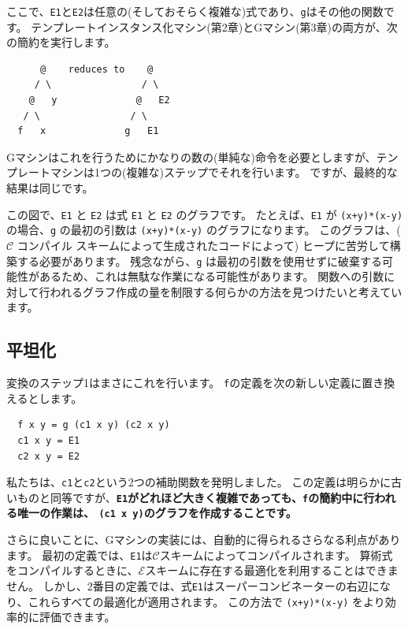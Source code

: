 \documentclass{jbook}
\begin{document}
ここで、\texttt{E1}と\texttt{E2}は任意の(そしておそらく複雑な)式であり、\texttt{g}はその他の関数です。
テンプレートインスタンス化マシン(第2章)とGマシン(第3章)の両方が、次の簡約を実行します。

\begin{verbatim}
      @    reduces to    @
     / \                / \
    @   y              @   E2
   / \                / \
  f   x              g   E1
\end{verbatim}

Gマシンはこれを行うためにかなりの数の(単純な)命令を必要としますが、テンプレートマシンは1つの(複雑な)ステップでそれを行います。
ですが、最終的な結果は同じです。

この図で、\texttt{E1} と \texttt{E2} は式 \texttt{E1} と \texttt{E2} のグラフです。
たとえば、\texttt{E1} が \texttt{(x+y)*(x-y)} の場合、\texttt{g} の最初の引数は \texttt{(x+y)*(x-y)} のグラフになります。
このグラフは、($\mathcal{C}$ コンパイル スキームによって生成されたコードによって) ヒープに苦労して構築する必要があります。
残念ながら、\texttt{g} は最初の引数を使用せずに破棄する可能性があるため、これは無駄な作業になる可能性があります。
関数への引数に対して行われるグラフ作成の量を制限する何らかの方法を見つけたいと考えています。

\subsection{平坦化}

変換のステップ1はまさにこれを行います。
\texttt{f}の定義を次の新しい定義に置き換えるとします。

\begin{verbatim}
  f x y = g (c1 x y) (c2 x y)
  c1 x y = E1
  c2 x y = E2
\end{verbatim}

私たちは、\texttt{c1}と\texttt{c2}という2つの補助関数を発明しました。
この定義は明らかに古いものと同等ですが、\textbf{\texttt{E1}がどれほど大きく複雑であっても、\texttt{f}の簡約中に行われる唯一の作業は、
	\texttt{(c1 x y)}のグラフを作成することです。}

さらに良いことに、Gマシンの実装には、自動的に得られるさらなる利点があります。
最初の定義では、\texttt{E1}は$\mathcal{C}$スキームによってコンパイルされます。
算術式をコンパイルするときに、$\mathcal{E}$スキームに存在する最適化を利用することはできません。
しかし、2番目の定義では、式\texttt{E1}はスーパーコンビネーターの右辺になり、これらすべての最適化が適用されます。
この方法で \texttt{(x+y)*(x-y)} をより効率的に評価できます。
\end{document}
